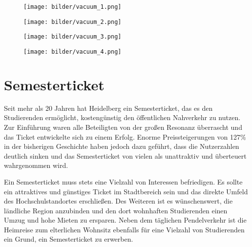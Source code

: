 

\begin{figure*}[b]
    \centering
    \begin{subfigure}{.24\textwidth}
        \texttt{[image: bilder/vacuum\_1.png]}
    \end{subfigure}
    \begin{subfigure}{.24\textwidth}
        \texttt{[image: bilder/vacuum\_2.png]}
    \end{subfigure}
    \begin{subfigure}{.24\textwidth}
        \texttt{[image: bilder/vacuum\_3.png]}
    \end{subfigure}
    \begin{subfigure}{.24\textwidth}
        \texttt{[image: bilder/vacuum\_4.png]}
    \end{subfigure}
\end{figure*}

\section{Semesterticket}
Seit mehr als 20 Jahren hat Heidelberg ein Semesterticket, das es den Studierenden ermöglicht, kostengünstig den öffentlichen Nahverkehr zu nutzen. Zur Einführung waren alle Beteiligten von der großen Resonanz überrascht und das Ticket entwickelte sich zu einem Erfolg. Enorme Preissteigerungen von 127\% in der bisherigen Geschichte haben jedoch dazu geführt, dass die Nutzerzahlen deutlich sinken und das Semesterticket von vielen als unattraktiv und überteuert wahrgenommen wird.

Ein Semesterticket muss stets eine Vielzahl von Interessen befriedigen. Es sollte ein attraktives und günstiges Ticket im Stadtbereich sein und das direkte Umfeld des Hochschulstandortes erschließen. Des Weiteren ist es wünschenswert, die ländliche Region anzubinden und den dort wohnhaften Studierenden einen Umzug und hohe Mieten zu ersparen. Neben dem täglichen Pendelverkehr ist die Heimreise zum elterlichen Wohnsitz ebenfalls für eine Vielzahl von Studierenden ein Grund, ein Semesterticket zu erwerben.

